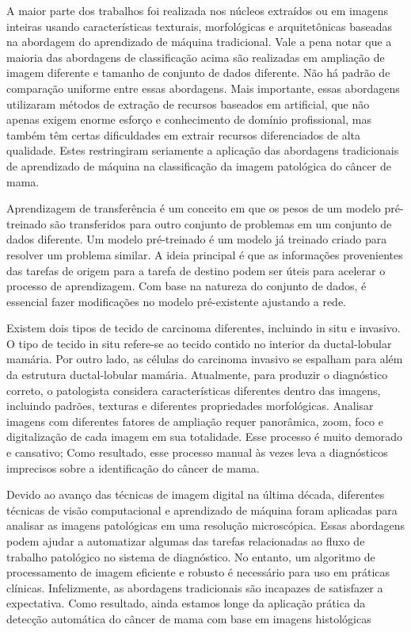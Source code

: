 \documentclass[preprint,12pt,authoryear]{elsarticle}
\begin{document}
A maior parte dos trabalhos foi realizada nos núcleos extraídos ou em imagens inteiras usando características texturais, morfológicas e arquitetônicas baseadas na abordagem do aprendizado de máquina tradicional. Vale a pena notar que a maioria das abordagens de classificação acima são realizadas em ampliação de imagem diferente e tamanho de conjunto de dados diferente. Não há padrão de comparação uniforme entre essas abordagens. Mais importante, essas abordagens utilizaram métodos de extração de recursos baseados em artificial, que não apenas exigem enorme esforço e conhecimento de domínio profissional, mas também têm certas dificuldades em extrair recursos diferenciados de alta qualidade. Estes restringiram seriamente a aplicação das abordagens tradicionais de aprendizado de máquina na classificação da imagem patológica do câncer de mama.


 Aprendizagem de transferência é um conceito em que os pesos de um modelo pré-treinado são transferidos para outro conjunto de problemas em um conjunto de dados diferente. Um modelo pré-treinado é um modelo já treinado criado para resolver um problema similar. A ideia principal é que as informações provenientes das tarefas de origem para a tarefa de destino podem ser úteis para acelerar o processo de aprendizagem. Com base na natureza do conjunto de dados, é essencial fazer modificações no modelo pré-existente ajustando a rede.
 
 Existem dois tipos de tecido de carcinoma diferentes, incluindo in situ e invasivo. O tipo de tecido in situ refere-se ao tecido contido no interior da ductal-lobular mamária. Por outro lado, as células do carcinoma invasivo se espalham para além da estrutura ductal-lobular mamária. Atualmente, para produzir o diagnóstico correto, o patologista considera características diferentes dentro das imagens, incluindo padrões, texturas e diferentes propriedades morfológicas. Analisar imagens com diferentes fatores de ampliação requer panorâmica, zoom, foco e digitalização de cada imagem em sua totalidade. Esse processo é muito demorado e cansativo; Como resultado, esse processo manual às vezes leva a diagnósticos imprecisos sobre a identificação do câncer de mama.
 
 Devido ao avanço das técnicas de imagem digital na última década, diferentes técnicas de visão computacional e aprendizado de máquina foram aplicadas para analisar as imagens patológicas em uma resolução microscópica. Essas abordagens podem ajudar a automatizar algumas das tarefas relacionadas ao fluxo de trabalho patológico no sistema de diagnóstico. No entanto, um algoritmo de processamento de imagem eficiente e robusto é necessário para uso em práticas clínicas. Infelizmente, as abordagens tradicionais são incapazes de satisfazer a expectativa. Como resultado, ainda estamos longe da aplicação prática da detecção automática do câncer de mama com base em imagens histológicas 
 
\end{document}
